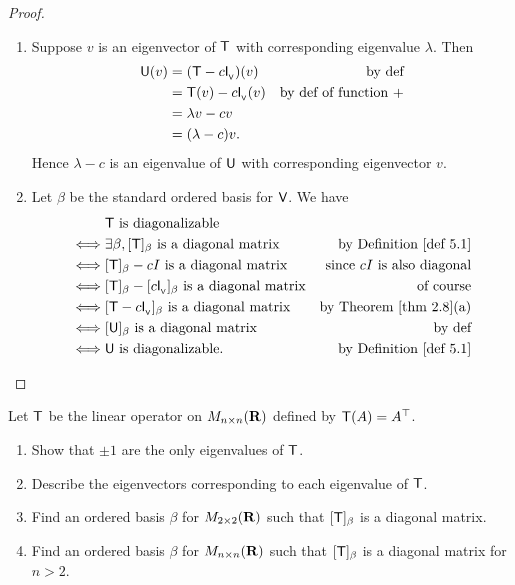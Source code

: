 \begin{proof} \ 

\begin{enumerate}
\item Suppose \(v\) is an eigenvector of \(\textsf{T}\) with corresponding eigenvalue \(\lambda\).
Then
\begin{align*}
    \textsf{U}(v) & = (\textsf{T} - c \textsf{I}_{_{\textsf{V}}})(v) & \text{by def} \\
          & = \textsf{T}(v) - c\textsf{I}_{_{\textsf{V}}}(v) & \text{by def of function \(+\)} \\
          & = \lambda v - c v \\
          & = (\lambda - c)v.
\end{align*}
Hence \(\lambda - c\) is an eigenvalue of \(\textsf{U}\) with corresponding eigenvector \(v\).

\item
Let \(\beta\) be the standard ordered basis for \(\textsf{V}\).
We have
\begin{align*}
         & \T \text{ is diagonalizable} \\
    \iff & \exists \beta, [\T]_{\beta} \text{ is a diagonal matrix} & \text{by \DEF{5.1}} \\
    \iff & [\T]_{\beta} - c I \text{ is a diagonal matrix} & \text{since \(c I\) is also diagonal} \\
    \iff & [\T]_{\beta} - [c \ITRANV]_{\beta} \text{ is a diagonal matrix} & \text{of course} \\
    \iff & [\T - c \ITRANV]_{\beta} \text{ is a diagonal matrix} & \text{by \THM{2.8}(a)} \\
    \iff & [\U]_{\beta} \text{ is a diagonal matrix} & \text{by def} \\
    \iff & \U \text{ is diagonalizable}. & \text{by \DEF{5.1}}
\end{align*}
\end{enumerate}
\end{proof}

\begin{exercise} \label{exercise 5.1.18}
Let \(\textsf{T}\) be the linear operator on \(M_{n \times n}(\mathbf{R})\) defined by \(\textsf{T}(A) = A^\top\).
\begin{enumerate}
\item Show that \(\pm 1\) are the only eigenvalues of \(\textsf{T}\).
\item Describe the eigenvectors corresponding to each eigenvalue of \(\textsf{T}\).
\item Find an ordered basis \(\beta\) for \(M_{2 \times 2}(\mathbf{R})\) such that \([\textsf{T}]_{\beta}\) is a diagonal matrix.
\item Find an ordered basis \(\beta\) for \(M_{n \times n}(\mathbf{R})\) such that \([\textsf{T}]_{\beta}\) is a diagonal
matrix for \(n > 2\).
\end{enumerate}
\end{exercise}

